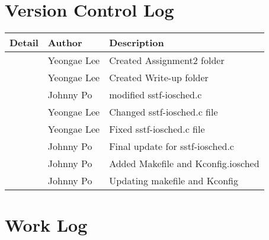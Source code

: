 \documentclass[10pt, letterpaper]{article}
\begin{document}
\section{Version Control Log}

\begin{tabular}{l l l}\textbf{Detail} & \textbf{Author} & \textbf{Description}\\\hline
        \href{https://github.com/jawhnypoh/Operating-Systems-II/commit/ba11cd86e157b7ddd316466b4f3fa4160d6dc1a2} & Yeongae Lee & Created Assignment2 folder  \\\hline
        \href{https://github.com/jawhnypoh/Operating-Systems-II/commit/52962d28e395878e5a8ae0fd88d5b86fb2baa14b} & Yeongae Lee & Created Write-up folder \\\hline
        \href{https://github.com/jawhnypoh/Operating-Systems-II/commit/357516be84d0e7bd7566a48166b43a916c6a739c} & Johnny Po & modified sstf-iosched.c \\\hline
        \href{https://github.com/jawhnypoh/Operating-Systems-II/commit/d4f0676e4debc2d5a73a90fa0d2cc272cc2af0de} & Yeongae Lee & Changed sstf-iosched.c file \\\hline 
        \href{https://github.com/jawhnypoh/Operating-Systems-II/commit/099a26b74d695d2f75d56e29ebc746a291d8681f} & Yeongae Lee & Fixed sstf-iosched.c file\\\hline
        \href{https://github.com/jawhnypoh/Operating-Systems-II/commit/436c867d441d8ac497a827a69cc6da726b600212} & Johnny Po & Final update for sstf-iosched.c \\\hline 
        \href{https://github.com/jawhnypoh/Operating-Systems-II/commit/a61d132ab004f063d6668cda8b7d98644e084fcf} & Johnny Po & Added Makefile and Kconfig.iosched \\\hline
        \href{https://github.com/jawhnypoh/Operating-Systems-II/commit/abaf512e267daf96e1c1fd3dfb573474bffa7d91} & Johnny Po & Updating makefile and Kconfig \\\hline
         
\end{tabular}


\section{Work Log}
\end{document}
